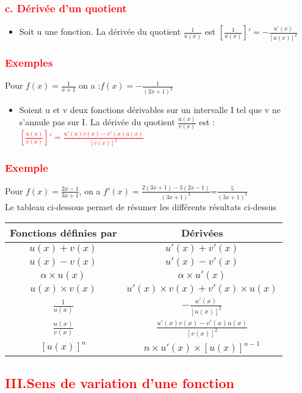\documentclass[12pt]{article}
\begin{document}
\subsubsection*{\textcolor{red}{c. Dérivée d’un quotient}}
\begin{itemize}
\item Soit u une fonction. La dérivée du quotient $\frac{1}{u(x)}$ est  
$\left[ \frac{1}{u(x)}\right]'=-\frac{u'(x)}{\left[ u(x)\right]^{2}}$
\end{itemize}
\subsubsection*{\textcolor{red}{Exemples}}
Pour $f(x) =\frac{1}{x+1}$ on a :$f(x)=-\frac{1}{(2x+1)^{2}}$
\begin{itemize}
\item Soient u et v deux fonctions dérivables sur un intervalle I tel que v ne s’annule pas sur I. La dérivée du quotient  $\frac{u(x)}{v(x)}$ est :\\
\textcolor{red}{$\left[\frac{u(x)}{v(x)}\right]'=\frac{u'(x)v(x)-v'(x)u(x)}{\left[ v(x)\right] ^{2}}$}
\end{itemize}
\subsubsection*{\textcolor{red}{Exemple}}
Pour $f(x)=\frac{2x-1}{3x+1}$, on a 
$f'(x)=\frac{2(3x+1)-3(2x-1)}{(3x+1)^{2}}$=$\frac{5}{(3x+1)^{2}}$\\
Le tableau ci-dessous permet de résumer les différents résultats ci-dessus\\
\begin{tabular}{|c|c|}
\hline
Fonctions définies par & Dérivées\\
\hline
$u(x)+v(x)$ & $u'(x)+v'(x)$ \\
\hline
$u(x)-v(x)$&$u'(x)-v'(x)$  \\
\hline
$\alpha\times u(x)$ & $\alpha\times u'(x)$\\
\hline
$u(x)\times v(x)$ & $u'(x) \times v(x) + v'(x) \times u(x)$\\
\hline
$\frac{1}{u(x)}$ & $-\frac{u'(x)}{\left[ u(x)\right] ^{2}}$\\
\hline
$\frac{u(x)}{v(x)}$ & $\frac{u'(x)v(x)-v'(x)u(x)}{\left[ v(x)\right] ^{2}}$\\
\hline
$[u(x)]^{n}$&$n \times u'(x) \times [u(x)]^{n-1}$\\
\hline
\end{tabular}
\subsection*{\textcolor{red}{III.Sens de variation d’une fonction}}
\end{document}
